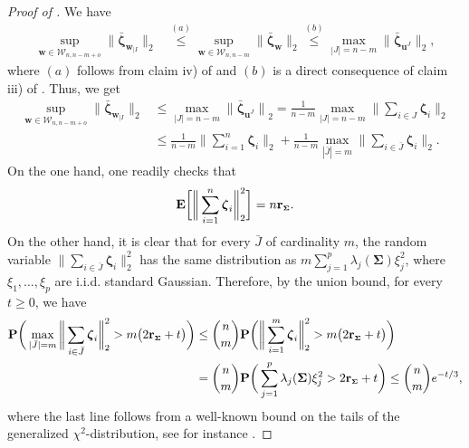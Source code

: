 \documentclass[aos,preprint,reqno]{imsart}
\newcommand\bzeta{\boldsymbol\zeta}
\newcommand\bSigma{\boldsymbol\Sigma}
\newcommand\bfE{\mathbf E}
\newcommand\bfP{\mathbf P}
\newcommand\bu{\boldsymbol u}
\newcommand\bw{\boldsymbol w}
\newcommand\rSigma{\textbf{\textup{r}}_{\scriptscriptstyle\bSigma}}
\theoremstyle{plain}
\theoremstyle{remark}
\begin{document}
	\begin{proof}[Proof of ] 
	We have
	\begin{align}
			\sup_{\bw\in \mathcal W_{n,n-m+o}}
			\|\bar{\bzeta}_{\bw_{|I}}\|_2 
					& \stackrel{(a)}{\le} 
							\sup_{\bw\in \mathcal W_{n,n-m}}\|\bar{\bzeta}_{\bw}\|_2
					\stackrel{(b)}{\le}
							\max_{|J| = n-m}
							\big\|\bar{\bzeta}_{\bu^{J}}\big\|_2,
			\label{eq:L21}
	\end{align}
	where $(a)$ follows from claim iv)  of  and $(b)$ is a direct 
	consequence of claim iii) of . Thus, we get
	\begin{align}
			\sup_{\bw\in \mathcal W_{n,n-m+o}}
			\|\bar{\bzeta}_{\bw_{|I}}\|_2
			&\le  \max_{|J| = n-m} 
							{\big\|\bar{\bzeta}_{\bu^{J}}\big\|}_2
							= \frac1{n-m}\max_{|J| = n-m}  
							\bigg\|\sum_{i\in J} \bzeta_i\bigg\|_2\\
			&\le \frac1{n-m}
							\bigg\|\sum_{i=1}^n \bzeta_i\bigg\|_2 + 
							\frac1{n-m}\max_{|\bar J| = m}  
							\bigg\|\sum_{i\in \bar J} \bzeta_i\bigg\|_2.\label{eq:L22}
	\end{align}
	On the one hand, one readily checks that
	\begin{align}\label{eq:L22a}
			\bfE\bigg[\bigg\|\sum_{i=1}^n \bzeta_i\bigg\|_2^2\bigg] = n\rSigma.
	\end{align}
	On the other hand, it is clear that for every $\bar J$ of cardinality $m$, 
	the random variable $\big\|\sum_{i\in \bar J} \bzeta_i\big\|^2_2$ has the 
	same distribution as $m\sum_{j=1}^p \lambda_j(\bSigma)\xi_j^2$, where
	$\xi_1,\ldots,\xi_p$ are i.i.d. standard Gaussian. Therefore, by the union bound, 
	for every $t\ge 0$, we have
	\begin{align}
			\bfP\bigg(\max_{|\bar J| = m}  \bigg\|\sum_{i\in \bar  J} 
			\bzeta_i\bigg\|^2_2>m \big(2\rSigma + t\big)\bigg) 
			&\le {{n}\choose{m}} \bfP\bigg(\bigg\|\sum_{i=1}^{m} 
			\bzeta_i\bigg\|_2^2 > m \big(2\rSigma + t\big)\bigg)\\
			&= {{n}\choose{m}} \bfP\bigg( \sum_{j=1}^p \lambda_j(\bSigma)\xi_j^2
			> 2\rSigma + t\bigg) 
			\le {{n}\choose{m}} e^{-t/3},
	\end{align}
	where the last line follows from a well-known bound on the tails of the 
	generalized $\chi^2$-distribution, see for instance \citep[Lemma 8]{comminges2012}.


\end{proof}
\end{document}
